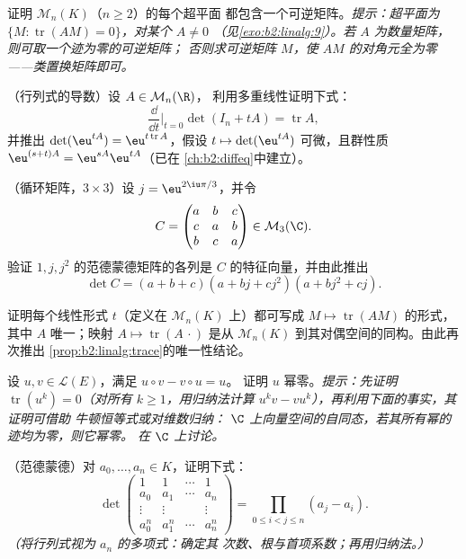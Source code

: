 \begin{exercise}[$\star\star$]\label{exo:b2:linalg:6}
证明 $\mathcal{M}_n(K)$（$n \geq 2$）的每个超平面
都包含一个可逆矩阵。\emph{提示：超平面为 $\{M :
\operatorname{tr}(AM) = 0\}$，对某个 $A \neq 0$
（见\cref{exo:b2:linalg:9}）。若 $A$ 为数量矩阵，则可取一个迹为零的可逆矩阵；
否则求可逆矩阵 $M$，使
$AM$ 的对角元全为零——类置换矩阵即可。}
\end{exercise}

\begin{exercise}[$\star\star$]\label{exo:b2:linalg:7}
（行列式的导数）设 $A \in \mathcal{M}_n(\R)$，
利用多重线性证明下式：
\[
\frac{\dd}{\dd t}\Big|_{t=0} \det(I_n + tA) = \operatorname{tr} A ,
\]
并推出 $\det(\eu^{tA}) = \eu^{t\operatorname{tr} A}$，假设
$t \mapsto \det(\eu^{tA})$ 可微，且群性质
$\eu^{(s+t)A} = \eu^{sA}\eu^{tA}$（已在
\cref{ch:b2:diffeq}中建立）。
\end{exercise}

\begin{exercise}[$\star\star$]\label{exo:b2:linalg:8}
（循环矩阵，$3 \times 3$）设 $j = \eu^{2\iu\pi/3}$，并令
\[
C = \begin{pmatrix}
a & b & c\\
c & a & b\\
b & c & a
\end{pmatrix} \in \mathcal{M}_3(\C).
\]
验证 $1, j, j^2$ 的范德蒙德矩阵的各列是
$C$ 的特征向量，并由此推出
\[
\det C = (a + b + c)(a + bj + cj^2)(a + bj^2 + cj).
\]
\end{exercise}

\begin{exercise}[$\star\star\star$]\label{exo:b2:linalg:9}
证明每个线性形式 $t$（定义在 $\mathcal{M}_n(K)$ 上）都可写成 $M \mapsto
\operatorname{tr}(AM)$ 的形式，其中 $A$ 唯一；映射 $A \mapsto
\operatorname{tr}(A\,\cdot)$ 是从
$\mathcal{M}_n(K)$ 到其对偶空间的同构。由此再次推出
\cref{prop:b2:linalg:trace}的唯一性结论。
\end{exercise}

\begin{exercise}[$\star\star\star$]\label{exo:b2:linalg:10}
设 $u, v \in \mathcal{L}(E)$，满足 $u \circ v - v \circ u = u$。
证明 $u$ 幂零。\emph{提示：先证明
$\operatorname{tr}(u^k) = 0$（对所有 $k \geq 1$，用归纳法计算 $u^k v -
v u^k$），再利用下面的事实，其证明可借助
牛顿恒等式或对维数归纳：
$\C$ 上向量空间的自同态，若其所有幂的迹均为零，则它幂零。
在 $\C$ 上讨论。}
\end{exercise}

\begin{exercise}[$\star\star$]\label{exo:b2:linalg:11}
（范德蒙德）对 $a_0, \dots, a_n \in K$，证明下式：
\[
\det\begin{pmatrix}
1 & 1 & \cdots & 1\\
a_0 & a_1 & \cdots & a_n\\
\vdots & \vdots & & \vdots\\
a_0^n & a_1^n & \cdots & a_n^n
\end{pmatrix}
= \prod_{0 \leq i < j \leq n} (a_j - a_i).
\]
\emph{（将行列式视为 $a_n$ 的多项式：确定其
次数、根与首项系数；再用归纳法。）}
\end{exercise}

